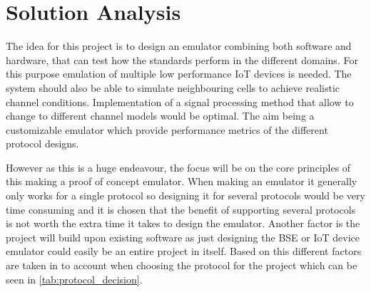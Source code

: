 \section{Solution Analysis}



The idea for this project is to design an emulator combining both software and hardware, that can test how the standards perform in the different domains. For this purpose emulation of multiple low performance \gls{IoT} devices is needed. The system should also be able to simulate neighbouring cells to achieve realistic channel conditions. Implementation of a signal processing method that allow to change to different channel models would be optimal. The aim being a customizable emulator which provide performance metrics of the different protocol designs.

However as this is a huge endeavour, the focus will be on the core principles of this making a proof of concept emulator. When making an emulator it generally only works for a single protocol so designing it for several protocols would be very time consuming and it is chosen that the benefit of supporting several protocols is not worth the extra time it takes to design the emulator. Another factor is the project will build upon existing software as just designing the \gls{BSE} or \gls{IoT} device emulator could easily be an entire project in itself. Based on this different factors are taken in to account when choosing the protocol for the project which can be seen in \autoref{tab:protocol_decision}.

